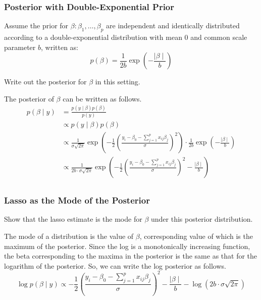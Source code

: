 \documentclass{article}
\begin{document}
\subsubsection{Posterior with Double-Exponential Prior}

\question
Assume the prior for $\beta: \beta_1, \ldots, \beta_p$ are independent and identically distributed according to a double-exponential distribution with mean 0 and common scale parameter $b$, written as:
\[
    p\left(\beta\right) = \frac{1}{2b} \exp \left( -\frac{\mid \beta \mid}{b} \right)
\]

Write out the posterior for $\beta$ in this setting.

\answer

The posterior of $\beta$ can be written as follows.
\begin{equation}
    \begin{split}
        p\left(\beta \mid y \right) &= \frac{p\left(y \mid \beta \right)  p\left(\beta\right)}{p\left(y\right)} \\
        &\propto p\left(y \mid \beta \right)  p\left(\beta\right) \\
        &\propto \frac{1}{\sigma\sqrt{2\pi}} \exp \left(-\frac{1}{2} \left(\frac{y_i - \beta_0 - \sum_{j=1}^{p} x_{ij} \beta_j}{\sigma}\right)^2\right) \cdot \frac{1}{2b} \exp \left( -\frac{\mid \beta \mid}{b} \right) \\
        &\propto \frac{1}{2b \cdot \sigma\sqrt{2\pi}} \exp \left(-\frac{1}{2} \left(\frac{y_i - \beta_0 - \sum_{j=1}^{p} x_{ij} \beta_j}{\sigma}\right)^2 -\frac{\mid \beta \mid}{b}\right) \\
    \end{split}
\end{equation}

\subsubsection{Lasso as the Mode of the Posterior}

\question
Show that the lasso estimate is the mode for $\beta$ under this posterior distribution.

\answer
The mode of a distribution is the value of $\beta$, corresponding value of which is the maximum of the posterior.
Since the log is a monotonically increasing function, the beta corresponding to the maxima in the posterior is the same as that for the logarithm of the posterior.
So, we can write the log posterior as follows.
\begin{equation}
    \log p\left(\beta \mid y \right) \propto -\frac{1}{2} \left(\frac{y_i - \beta_0 - \sum_{j=1}^{p} x_{ij} \beta_j}{\sigma}\right)^2 -\frac{\mid \beta \mid}{b} - \log \left(2b \cdot \sigma\sqrt{2\pi}\right) 
\end{equation}
\end{document}
